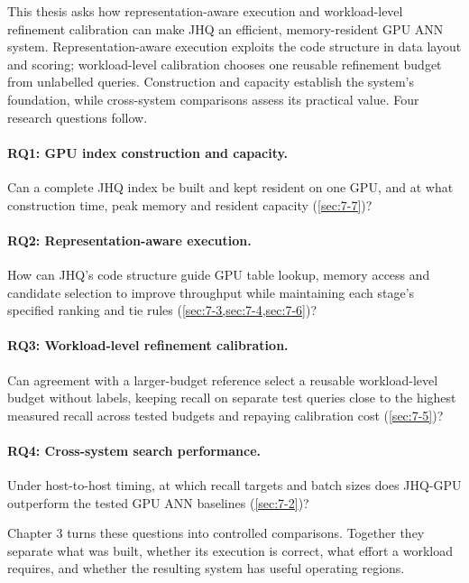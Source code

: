 This thesis asks how representation-aware execution and workload-level
refinement calibration can make JHQ an efficient, memory-resident GPU ANN
system. Representation-aware execution exploits the code structure in
data layout and scoring; workload-level calibration chooses one reusable
refinement budget from unlabelled queries. Construction and capacity
establish the system's foundation, while cross-system comparisons assess
its practical value. Four research questions follow.

\paragraph{RQ1: GPU index construction and capacity.}
Can a complete JHQ index be built and kept resident on one GPU, and at
what construction time, peak memory and resident capacity (\cref{sec:7-7})?

\paragraph{RQ2: Representation-aware execution.}
How can JHQ's code structure guide GPU table lookup, memory access and
candidate selection to improve throughput while maintaining each stage's
specified ranking and tie rules (\cref{sec:7-3,sec:7-4,sec:7-6})?

\paragraph{RQ3: Workload-level refinement calibration.}
Can agreement with a larger-budget reference select a reusable
workload-level budget without labels, keeping recall on separate test
queries close to the highest measured recall across tested budgets and
repaying calibration cost (\cref{sec:7-5})?

\paragraph{RQ4: Cross-system search performance.}
Under host-to-host timing, at which recall targets and batch sizes does
JHQ-GPU outperform the tested GPU ANN baselines (\cref{sec:7-2})?

Chapter 3 turns these questions into controlled comparisons. Together they
separate what was built, whether its execution is correct, what effort a
workload requires, and whether the resulting system has useful operating
regions.
